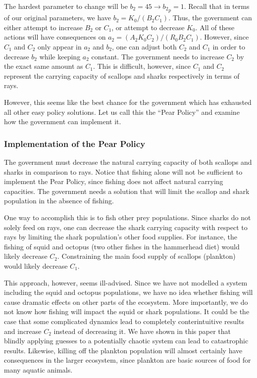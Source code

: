 \documentclass[12pt,journal,compsoc,twoside]{IEEEtran}
\begin{document}
The hardest parameter to change will be $b_2 = 45 \to {{b_2}_p} = 1$. Recall that in terms of our original parameters, we have $b_2 = K_0 / (B_2 C_1)$. Thus, the government can either attempt to increase $B_2$ or $C_1$, or attempt to decrease $K_0$. All of these actions will have consequences on $a_2 = (A_2 K_0 C_2) / (R_0 B_2 C_1)$. However, since $C_1$ and $C_2$ only appear in $a_2$ and $b_2$, one can adjust both $C_2$ and $C_1$ in order to decrease $b_2$ while keeping $a_2$ constant. The government needs to increase $C_2$ by the exact same amount as $C_1$. This is difficult, however, since $C_1$ and $C_2$ represent the carrying capacity of scallops and sharks respectively in terms of rays. 

However, this seems like the best chance for the government which has exhausted all other easy policy solutions. Let us call this the ``Pear Policy'' and examine how the government can implement it.

\subsubsection{Implementation of the Pear Policy}

The government must decrease the natural carrying capacity of both scallops and sharks in comparison to rays. Notice that fishing alone will not be sufficient to implement the Pear Policy, since fishing does not affect natural carrying capacities. The government needs a solution that will limit the scallop and shark population in the absence of fishing.

One way to accomplish this is to fish other prey populations. Since sharks do not solely feed on rays, one can decrease the shark carrying capacity with respect to rays by limiting the shark population's other food supplies. For instance, the fishing of squid and octopus (two other fishes in the hammerhead diet) would likely decrease $C_2$. Constraining the main food supply of scallops (plankton) would likely decrease $C_1$. 

This approach, however, seems ill-advised. Since we have not modelled a system including the squid and octopus populations, we have no idea whether fishing will cause dramatic effects on other parts of the ecosystem. More importantly, we do not know how fishing will impact the squid or shark populations. It could be the case that some complicated dynamics lead to completely conterintuitive results and increase $C_2$ instead of decreasing it. We have shown in this paper that blindly applying guesses to a potentially chaotic system can lead to catastrophic results. Likewise, killing off the plankton population will almost certainly have consequences in the larger ecosystem, since plankton are basic sources of food for many aquatic animals.
\end{document}
